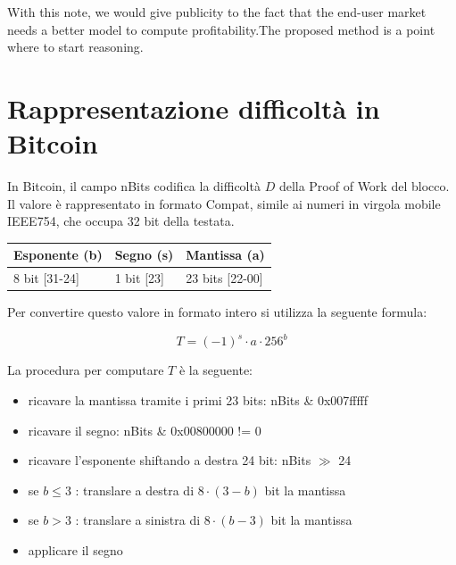 \documentclass{article}
\begin{document}
With this note, we would give publicity to the fact that the end-user market needs a better model to compute profitability.The proposed method is a point where to start reasoning.

\newpage

\appendix

\section{Rappresentazione difficoltà in Bitcoin}

In Bitcoin, il campo nBits codifica la difficoltà $D$ della Proof of Work del blocco.
Il valore è rappresentato in formato Compat, simile ai numeri in virgola mobile IEEE754, che occupa 32 bit della testata.

\begin{table}[h]
    \centering
    \begin{tabular}{|l|l|l|}
        \hline
        \multicolumn{1}{|c|}{Esponente (b)} & \multicolumn{1}{c|}{Segno (s)} & \multicolumn{1}{c|}{Mantissa (a)} \\ \hline
        8 bit {[}31-24{]}               & 1 bit {[}23{]}             & 23 bits {[}22-00{]}           \\ \hline
    \end{tabular}
\end{table}

Per convertire questo valore in formato intero si utilizza la seguente formula:

\begin{equation}
    T = (-1)^{s} \cdot a \cdot 256^{b}
\end{equation}

La procedura per computare $T$ è la seguente:

\begin{itemize}
    \item ricavare la mantissa tramite i primi 23 bits: nBits \& 0x007fffff
    \item ricavare il segno: nBits \& 0x00800000 != 0
    \item ricavare l'esponente shiftando a destra 24 bit: nBits $\gg$ 24
    \item se $b \le 3$ : translare a destra di $8 \cdot {(3 - b)}$ bit la mantissa
    \item se $b > 3$ : translare a sinistra di $8 \cdot {(b - 3)}$ bit la mantissa
    \item applicare il segno
\end{itemize}
\end{document}
